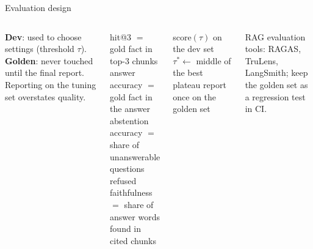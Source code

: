\documentclass[aspectratio=169,11pt]{beamer}
\begin{document}

\begin{frame}{Evaluation design}
\begin{columns}[T]
\begin{bdef}
\textbf{Dev}: used to choose settings (threshold $\tau$). \textbf{Golden}: never touched until the final report. Reporting on the tuning set overstates quality.
\end{bdef}
\begin{bmath}[Metrics]
hit@3 $=$ gold fact in top-3 chunks\\
answer accuracy $=$ gold fact in the answer\\
abstention accuracy $=$ share of unanswerable questions refused\\
faithfulness $=$ share of answer words found in cited chunks
\end{bmath}
\begin{balgo}
\begin{algorithmic}[1]
  \State score$(\tau)$ on the dev set
\EndFor
\State $\tau^\ast\gets$ middle of the best plateau
\State report once on the golden set
\end{algorithmic}
\end{balgo}
\begin{bapp}
RAG evaluation tools: RAGAS, TruLens, LangSmith; keep the golden set as a regression test in CI.
\end{bapp}
\end{columns}
\end{frame}
\end{document}
